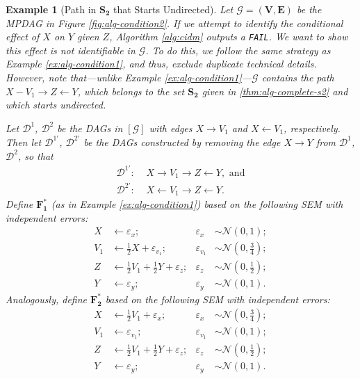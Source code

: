 \documentclass[11pt]{article}
\newtheorem{example}{Example}
\newcommand{\mb}[1]{\mathbf{#1}}
\newcommand{\g}[1][G]{\mathcal{#1}}
\begin{document}
\begin{example}[Path in $\mb{S_2}$ that Starts Undirected]
\label{ex:alg-condition2}    
    Let $\g=(\mb{V},\mb{E})$ be the MPDAG in Figure \ref{fig:alg-condition2}. If we attempt to identify the conditional effect of $X$ on $Y$ given $Z$, Algorithm \ref{alg:cidm} outputs a \texttt{FAIL}. We want to show this effect is not identifiable in $\g$. To do this, we follow the same strategy as Example \ref{ex:alg-condition1}, and thus, exclude duplicate technical details. However, note that---unlike Example \ref{ex:alg-condition1}---$\g$ contains the path $X - V_1 \to Z \gets Y$, which belongs to the set $\mb{S_2}$ given in \eqref{thm:alg-complete-s2} and which starts undirected.

    Let $\g[D]^1$, $\g[D]^2$ be the DAGs in $[\g]$ with edges $X \to V_1$ and $X \gets V_1$, respectively. Then let $\g[D]^{1'}$, $\g[D]^{2'}$ be the DAGs constructed by removing the edge $X \to Y$ from $\g[D]^1$, $\g[D]^2$, so that 
    \begin{align*}
        \g[D]^{1'}: \,\, &X \to V_1 \to Z \gets Y, \text{ and} \\
        \g[D]^{2'}: \,\, &X \gets V_1 \to Z \gets Y.
    \end{align*}
    Define $\mb{F^*_1}$ (as in Example \ref{ex:alg-condition1}) based on the following SEM with independent errors:
    \begin{align*}
        X   &\gets  \varepsilon_x;                     &\varepsilon_x &\sim \mathcal{N}(0,1);\\
        V_1 &\gets \tfrac{1}{2}X + \varepsilon_{v_1};  &\varepsilon_{v_1} &\sim \mathcal{N}(0,\tfrac{3}{4});\\
        Z   &\gets \tfrac{1}{2} V_1 + \tfrac{1}{2} Y + \varepsilon_z; &\varepsilon_z &\sim \mathcal{N}(0, \tfrac{1}{2});\\
        Y   &\gets \varepsilon_y;                      &\varepsilon_y &\sim \mathcal{N}(0,1).
    \end{align*}
    Analogously, define $\mb{F^*_2}$ based on the following SEM with independent errors:
    \begin{align*}
        X &\gets \tfrac{1}{2}V_1 + \varepsilon_x;        &\varepsilon_x &\sim \mathcal{N}(0,\tfrac{3}{4});\\
        V_1   &\gets  \varepsilon_{v_1};               &\varepsilon_{v_1} &\sim \mathcal{N}(0,1);\\
        Z   &\gets \tfrac{1}{2} V_1 + \tfrac{1}{2} Y + \varepsilon_z; &\varepsilon_z &\sim \mathcal{N}(0, \tfrac{1}{2});\\
        Y   &\gets \varepsilon_y;                      &\varepsilon_y &\sim \mathcal{N}(0,1).
    \end{align*}
    

\end{example}
\end{document}
